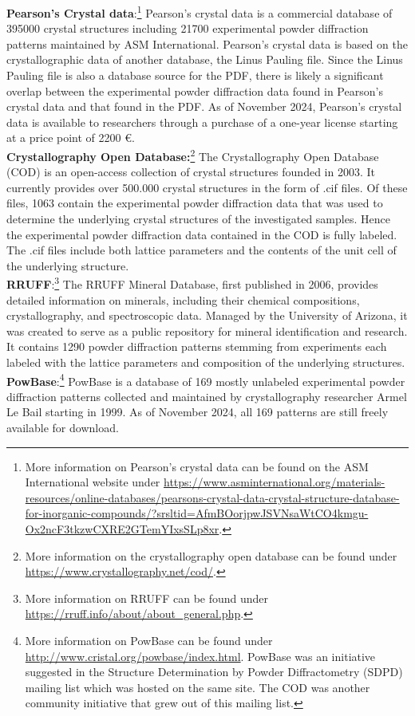 \textbf{Pearson's Crystal data}:\footnote{More information on Pearson's crystal data can be found on the ASM International website under \url{https://www.asminternational.org/materials-resources/online-databases/pearsons-crystal-data-crystal-structure-database-for-inorganic-compounds/?srsltid=AfmBOorjpwJSVNsaWtCO4kmgu-Ox2ncF3tkzwCXRE2GTemYIxsSLp8xr}.} Pearson's crystal data is a commercial database of 395000 crystal structures including 21700 experimental powder diffraction patterns maintained by ASM International. Pearson's crystal data is based on the crystallographic data of another database, the Linus Pauling file. \cite{kaduk2007} Since the Linus Pauling file is also a database source for the PDF, there is likely a significant overlap between the experimental powder diffraction data found in Pearson's crystal data and that found in the PDF. As of November 2024, Pearson's crystal data is available to researchers through a purchase of a one-year license starting at a price point of 2200 \euro.\\

\textbf{Crystallography Open Database:}\footnote{More information on the crystallography open database can be found under \url{https://www.crystallography.net/cod/}.} The Crystallography Open Database (COD) is an open-access collection of crystal structures founded in 2003. \cite{Graulis2009cod} It currently provides over 500.000 crystal structures in the form of .cif files. Of these files, 1063 contain the experimental powder diffraction data that was used to determine the underlying crystal structures of the investigated samples. Hence the experimental powder diffraction data contained in the COD is fully labeled. The .cif files include both lattice parameters and the contents of the unit cell of the underlying structure. \\

\textbf{RRUFF}:\footnote{More information on RRUFF can be found under \url{https://rruff.info/about/about_general.php}.} The RRUFF Mineral Database, first published in 2006, provides detailed information on minerals, including their chemical compositions, crystallography, and spectroscopic data. Managed by the University of Arizona, it was created to serve as a public repository for mineral identification and research. It contains \num{1290} powder diffraction patterns stemming from experiments each labeled with the lattice parameters and composition of the underlying structures. \\

\textbf{PowBase}:\footnote{More information on PowBase can be found under \url{http://www.cristal.org/powbase/index.html}. PowBase was an initiative suggested in the Structure Determination by
Powder Diffractometry (SDPD) mailing list which was hosted on the same site. The COD was another community initiative that grew out of this mailing list.} PowBase is a database of 169 mostly unlabeled experimental powder diffraction patterns collected and maintained by crystallography researcher Armel Le Bail starting in 1999. As of November 2024, all 169 patterns are still freely available for download. \\

